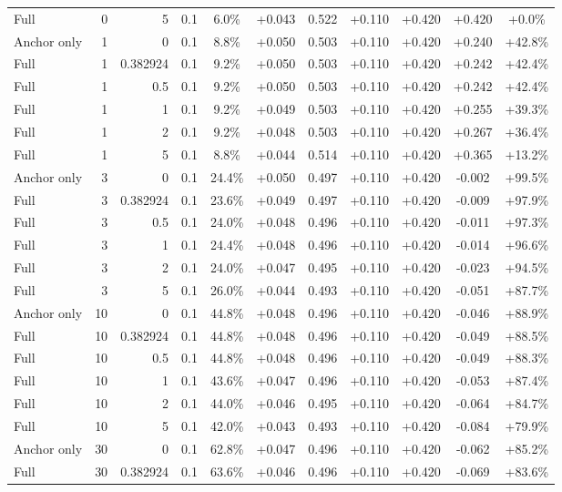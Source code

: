 \begin{table}[htbp]
\begin{tabular}{lrrrccccccc}
Full & 0 & 5 & 0.1 & 6.0\% & +0.043 & 0.522 & +0.110 & +0.420 & +0.420 & +0.0\% \\
Anchor only & 1 & 0 & 0.1 & 8.8\% & +0.050 & 0.503 & +0.110 & +0.420 & +0.240 & +42.8\% \\
Full & 1 & 0.382924 & 0.1 & 9.2\% & +0.050 & 0.503 & +0.110 & +0.420 & +0.242 & +42.4\% \\
Full & 1 & 0.5 & 0.1 & 9.2\% & +0.050 & 0.503 & +0.110 & +0.420 & +0.242 & +42.4\% \\
Full & 1 & 1 & 0.1 & 9.2\% & +0.049 & 0.503 & +0.110 & +0.420 & +0.255 & +39.3\% \\
Full & 1 & 2 & 0.1 & 9.2\% & +0.048 & 0.503 & +0.110 & +0.420 & +0.267 & +36.4\% \\
Full & 1 & 5 & 0.1 & 8.8\% & +0.044 & 0.514 & +0.110 & +0.420 & +0.365 & +13.2\% \\
Anchor only & 3 & 0 & 0.1 & 24.4\% & +0.050 & 0.497 & +0.110 & +0.420 & -0.002 & +99.5\% \\
Full & 3 & 0.382924 & 0.1 & 23.6\% & +0.049 & 0.497 & +0.110 & +0.420 & -0.009 & +97.9\% \\
Full & 3 & 0.5 & 0.1 & 24.0\% & +0.048 & 0.496 & +0.110 & +0.420 & -0.011 & +97.3\% \\
Full & 3 & 1 & 0.1 & 24.4\% & +0.048 & 0.496 & +0.110 & +0.420 & -0.014 & +96.6\% \\
Full & 3 & 2 & 0.1 & 24.0\% & +0.047 & 0.495 & +0.110 & +0.420 & -0.023 & +94.5\% \\
Full & 3 & 5 & 0.1 & 26.0\% & +0.044 & 0.493 & +0.110 & +0.420 & -0.051 & +87.7\% \\
Anchor only & 10 & 0 & 0.1 & 44.8\% & +0.048 & 0.496 & +0.110 & +0.420 & -0.046 & +88.9\% \\
Full & 10 & 0.382924 & 0.1 & 44.8\% & +0.048 & 0.496 & +0.110 & +0.420 & -0.049 & +88.5\% \\
Full & 10 & 0.5 & 0.1 & 44.8\% & +0.048 & 0.496 & +0.110 & +0.420 & -0.049 & +88.3\% \\
Full & 10 & 1 & 0.1 & 43.6\% & +0.047 & 0.496 & +0.110 & +0.420 & -0.053 & +87.4\% \\
Full & 10 & 2 & 0.1 & 44.0\% & +0.046 & 0.495 & +0.110 & +0.420 & -0.064 & +84.7\% \\
Full & 10 & 5 & 0.1 & 42.0\% & +0.043 & 0.493 & +0.110 & +0.420 & -0.084 & +79.9\% \\
Anchor only & 30 & 0 & 0.1 & 62.8\% & +0.047 & 0.496 & +0.110 & +0.420 & -0.062 & +85.2\% \\
Full & 30 & 0.382924 & 0.1 & 63.6\% & +0.046 & 0.496 & +0.110 & +0.420 & -0.069 & +83.6\% \\

\end{tabular}
\end{table}
